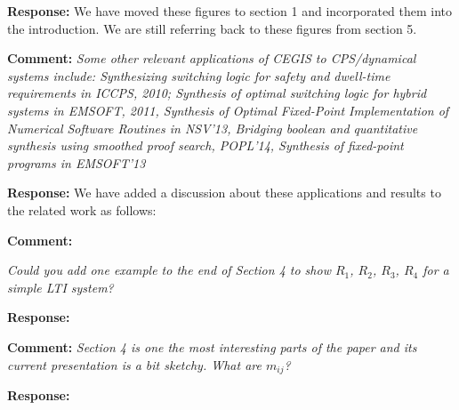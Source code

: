 \documentclass{article}
\begin{document}
\vspace{1em}
{\bf Response: }
We have moved these figures to section 1 and incorporated them into the introduction. We are still referring back to these figures from section 5.

\vspace{2em}

{\bf Comment: } {\itshape
Some other relevant applications of CEGIS to CPS/dynamical systems include: Synthesizing switching logic for
safety and dwell-time requirements in ICCPS, 2010; Synthesis of optimal switching logic for hybrid systems in EMSOFT, 2011, Synthesis of Optimal
Fixed-Point Implementation of Numerical Software Routines in NSV'13, Bridging boolean and quantitative synthesis using smoothed proof search,
POPL'14, Synthesis of fixed-point programs in EMSOFT'13}

\vspace{1em}
{\bf Response: }
We have added a discussion about these applications and results to the related work as follows:

\vspace{2em}
{\bf Comment: } {\itshape Could you add one example to the end of Section 4 to show $R_1$, $R_2$, $R_3$, $R_4$ for a simple LTI system? 

\vspace{1em}
{\bf Response: }


\vspace{2em}
{\bf Comment: } {\itshape 
Section 4 is one the most interesting parts
of the paper and its current presentation is a bit sketchy. What are $m_{ij}$?} } 

\vspace{1em}
{\bf Response: }





\end{document}
